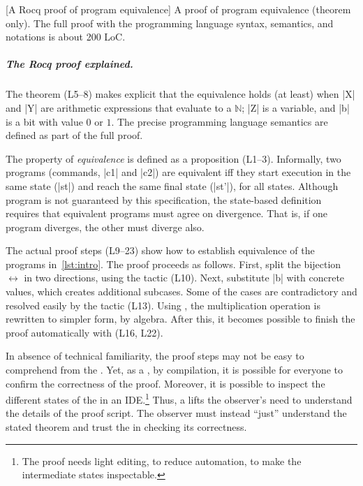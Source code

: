 \begin{center}
\captionsetup{type=lstlisting}
[A Rocq proof of program equivalence]{
A  proof of program equivalence (theorem only).
The full proof with the programming language syntax, semantics, and notations is
about 200 LoC.\footnotemark}
\label{lst:eq-proof}
\end{center}%

\subparagraph*{The Rocq proof explained.}
The  theorem (L5--8) makes explicit that the equivalence holds (at
least) when \pr|X| and \pr|Y| are arithmetic expressions that evaluate to a
\(\mathbb{N}\); \pr|Z| is a variable, and \pr|b| is a bit with value
\(0\) or \(1\). The precise programming language semantics are defined as part
of the full  proof.

The property of \emph{equivalence} is defined as a proposition (L1--3).
Informally, two programs (commands, \pr|c1| and \pr|c2|) are equivalent iff they
start execution in the same state (\pr|st|) and reach the same final state
(\pr|st'|), for all states. Although program  is not guaranteed
by this specification, the state-based definition requires that equivalent
programs must agree on divergence. That is, if one program diverges, the other
must diverge also.

The actual proof steps (L9--23) show how to establish equivalence of the
programs in~\autoref{lst:intro}. The proof proceeds as follows. First, split the
bijection \(\leftrightarrow\) in two directions, using the  tactic
(L10). Next, substitute \pr|b| with concrete values, which creates additional
subcases. Some of the cases are contradictory and resolved easily by the
 tactic (L13). Using , the multiplication
operation is rewritten to simpler form, by algebra. After this, it becomes
possible to finish the proof automatically with  (L16, L22).

In absence of technical familiarity, the proof steps may not be easy to
comprehend from the . Yet, as a , by
compilation, it is possible for everyone to confirm the correctness of the
proof. Moreover, it is possible to inspect the different states of the
 in an IDE.\footnote{The proof needs light editing, to reduce
automation, to make the intermediate states inspectable.} Thus, a
 lifts the observer's need to understand the details of
the proof script. The observer must instead \enquote{just} understand the
stated theorem and trust the  in checking its correctness.

